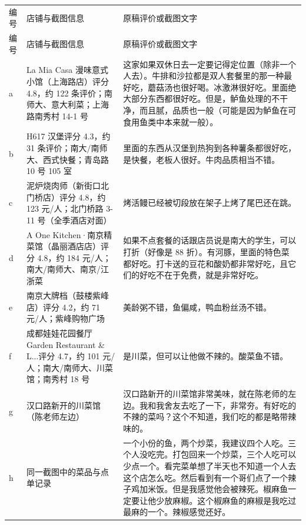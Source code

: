 \begin{longtable}{>{\RaggedRight\arraybackslash}p{}>{\RaggedRight\arraybackslash}p{}>{\RaggedRight\arraybackslash}p{}}
\multicolumn{3}{l}{\textbf{堂食店铺信息（由原截图转录）}}\\[0.35em]
\toprule
编号 & 店铺与截图信息 & 原稿评价或截图文字 \\
\midrule
\endfirsthead
\toprule
编号 & 店铺与截图信息 & 原稿评价或截图文字 \\
\midrule
\endhead
\bottomrule
\endfoot
a & La Mia Casa 漫味意式小馆（上海路店）\newline 评分 4.8，约 122 条评价；南师大、意大利菜；上海路南秀村 14-1 号 & 这家如果双休日去一定要记得定位置（除非一个人去）。牛排和沙拉都是双人套餐里的那一种最好吃，蘑菇汤也很好喝。冰激淋很好吃。里面绝大部分东西都很好吃。但是，鲈鱼处理的不干净，而且腻，品质也一般（可能是因为鲈鱼在可食用鱼类中本来就一般）。 \\
\midrule
b & H617 汉堡\newline 评分 4.3，约 31 条评价；南大/南师大、西式快餐；青岛路 10 号 105 室 & 里面的东西从汉堡到热狗到各种薯条都很好吃，是快餐，老板人很好。牛肉品质相当不错。 \\
\midrule
c & 泥炉烧肉师（新街口北门桥店）\newline 评分 4.8，约 123 元/人；北门桥路 3-11 号（全季酒店对面） & 烤活鳗已经被切段放在架子上烤了尾巴还在跳。 \\
\midrule
d & A One Kitchen·南京精菜馆（晶丽酒店店）\newline 评分 4.8，约 184 元/人；南大/南师大、南京/江浙菜 & 如果不点套餐的话跟店员说是南大的学生，可以打折（好像是 88 折）。有河豚，里面的特色菜都好吃。打卡送的豆花和酸奶都非常好吃，且它们的好吃不在于免费，就是非常好吃。 \\
\midrule
e & 南京大牌档（鼓楼紫峰店）\newline 评分 4.2，约 71 元/人；紫峰购物广场 & 美龄粥不错，鱼偏咸，鸭血粉丝汤不错。 \\
\midrule
f & 成都娃娃花园餐厅 Garden Restaurant \& L...\newline 评分 4.7，约 101 元/人；南大/南师大、川菜馆；南秀村 18 号 & 是川菜，但可以让他做不辣的。酸菜鱼不错。 \\
\midrule
g & 汉口路新开的川菜馆（陈老师左边） & 汉口路新开的川菜馆非常美味，就在陈老师的左边。我和我舍友去吃了一下，非常夯。\newline 有好吃的不辣的菜吗？\newline 这个不知道，我们吃的都是略带辣味的。 \\
\midrule
h & 同一截图中的菜品与点单记录 & 一个小份的鱼，两个炒菜，我建议四个人吃。三个人没吃完。\newline 打包回来一个炒菜，三个人吃可以少点一个。\newline 看完菜单想了半天也不知道一个人去这个店怎么吃。然后看到有一个哥们点了一个辣子鸡加米饭。\newline 但是我感觉他会被辣死。\newline 椒麻鱼一定要让他少放麻椒。这个椒麻鱼的麻椒是我吃过最麻的一个。\newline 辣椒感觉还好。 \\
\end{longtable}
